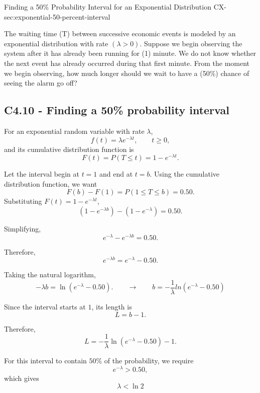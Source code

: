 	\sectionScored
	{Finding a 50\% Probability Interval for an Exponential Distribution}
	{CX-}
	{sec:exponential-50-percent-interval}
	{
		The waiting time (T) between successive economic events is modeled by an exponential distribution with rate $(\lambda>0)$. Suppose we begin observing the system after it has already been running for (1) minute. We do not know whether the next event has already occurred during that first minute. From the moment we begin observing, how much longer should we wait to have a (50\%) chance of seeing the alarm go off?
		
		
		\subsection*{C4.10 - Finding a 50\% probability interval}
		\label{subsec:c4-exponential-50-percent-interval}
		
		For an exponential random variable with rate \(\lambda\),
		\[
		f(t)=\lambda e^{-\lambda t},
		\qquad t\geq0,
		\]
		and its cumulative distribution function is
		\[
		F(t)=P(T\leq t)=1-e^{-\lambda t}.
		\]
		
		Let the interval begin at \(t=1\) and end at \(t=b\). Using the cumulative distribution function, we want
		\[
		F(b)-F(1)=P(1\leq T\leq b)=0.50.
		\]
		Substituting \(F(t)=1-e^{-\lambda t}\),
		\[
		\left(1-e^{-\lambda b}\right)
		-\left(1-e^{-\lambda}\right)
		=0.50.
		\]
		
		Simplifying,
		\[
		e^{-\lambda}-e^{-\lambda b}=0.50.
		\]
		
		Therefore,
		\[
		e^{-\lambda b}
		=e^{-\lambda}-0.50.
		\]
		
		Taking the natural logarithm,
		\[
		-\lambda b
		=\ln\left(e^{-\lambda}-0.50\right).
		\qquad \longrightarrow \qquad
			b=-\frac{1}{\lambda}
			ln\left(e^{-\lambda}-0.50\right)
		\]
		
		Since the interval starts at \(1\), its length is
		\[
		L=b-1.
		\]
		
		Therefore,
		\[
		\boxed{
			L=
			-\frac{1}{\lambda}
			\ln\left(e^{-\lambda}-0.50\right)-1
		}.
		\]
		
		For this interval to contain \(50\%\) of the probability, we require
		\[
		e^{-\lambda}>0.50,
		\]
		which gives
		\[
		\boxed{\lambda<\ln 2} \]
		\vspace{-5mm}
	}
	
